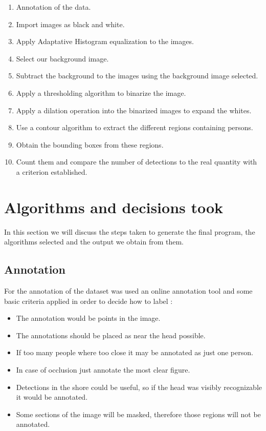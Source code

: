 \documentclass[10pt]{article}
\begin{document}
\begin{enumerate}
  \item Annotation of the data.
  \item Import images as black and white.
  \item Apply Adaptative Histogram equalization to the images.
  \item Select our background image.
  \item Subtract the background to the images using the background image selected.
  \item Apply a thresholding algorithm to binarize the image.
  \item Apply a dilation operation into the binarized images to expand the whites.
  \item Use a contour algorithm to extract the different regions containing persons.
  \item Obtain the bounding boxes from these regions.
  \item Count them and compare the number of detections to the real quantity with a criterion established.
\end{enumerate}

\section{Algorithms and decisions took}
In this section we will discuss the steps taken to generate the final program, the algorithms selected and the output we obtain from them.

\subsection{Annotation}

For the annotation of the dataset was used an online annotation tool and some basic criteria applied in order to decide how to label :
\begin{itemize}
  \item The annotation would be points in the image.
  \item The annotations should be placed as near the head possible.
  \item If too many people where too close it may be annotated as just one person.
  \item In case of occlusion just annotate the most clear figure.
  \item Detections in the shore could be useful, so if the head was visibly recognizable it would be annotated.
  \item Some sections of the image will be masked, therefore those regions will not be annotated.
\end{itemize}
\end{document}
